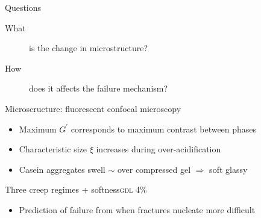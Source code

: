 \documentclass[xcolor=table]{beamer}
\begin{document}
\begin{frame}{Questions}
\begin{description}
\item[What] is the change in microstructure?
\item[How] does it affects the failure mechanism?
\end{description}
\end{frame}

\begin{frame}{Microscructure: fluorescent confocal microscopy}
	
	\begin{itemize}
	\item Maximum $G^\prime$ corresponds to maximum contrast between phases
	\item Characteristic size $\xi$ increases during over-acidification
	\item Casein aggregates swell $\sim$ over compressed gel $\Rightarrow$ soft glassy
	\end{itemize}
\end{frame}

\begin{frame}{Three creep regimes + softness\hfill\textsc{gdl} 4\%}
\vfill
	
\begin{itemize}
\item Prediction of failure from when fractures nucleate more difficult
\end{itemize}

\end{frame}


\begin{frame}[plain]
	\titlepage
\end{frame}
\end{document}

